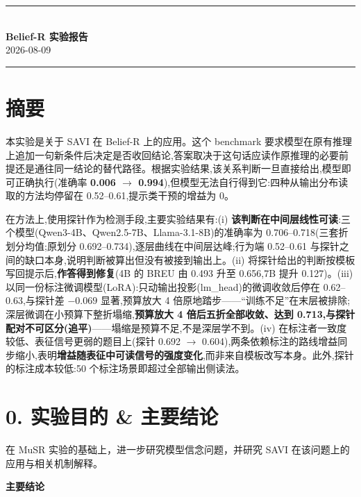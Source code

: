 \documentclass[fontset=none,10.5pt]{ctexart}
\begin{document}
\thispagestyle{empty}

\begin{center}
{\color{accent}\rule{\linewidth}{1.2pt}}\\[0.6em]
{\LARGE\bfseries\color{accent} Belief-R 实验报告}\\[0.5em]
{\small\color{black!55} 2026-08-09}\\[0.55em]
{\color{accent}\rule{\linewidth}{0.5pt}}
\end{center}
\vspace{0.4em}

\section*{摘要}

本实验是关于 SAVI 在 Belief-R 上的应用。这个 benchmark 要求模型在原有推理上追加一句新条件后决定是否收回结论,答案取决于这句话应读作原推理的必要前提还是通往同一结论的替代路径。根据实验结果,该关系判断一旦直接给出,模型即可正确执行(准确率 \textbf{0.006 $\to$ 0.994}),但模型无法自行得到它:四种从输出分布读取的方法均停留在 0.52--0.61,提示类干预的增益为 0。

在方法上,使用探针作为检测手段,主要实验结果有:(i) \textbf{该判断在中间层线性可读}:三个模型(Qwen3-4B、Qwen2.5-7B、Llama-3.1-8B)的准确率为 0.706--0.718(三套折划分均值;原划分 0.692--0.734),逐层曲线在中间层达峰;行为端 0.52--0.61 与探针之间的缺口本身,说明判断被算出但没有被接到输出上。(ii) 将探针给出的判断按模板写回提示后,\textbf{作答得到修复}(4B 的 BREU 由 0.493 升至 0.656,7B 提升 0.127)。(iii) 以同一份标注微调模型(LoRA):只动输出投影(lm\_head)的微调收敛后停在 0.62--0.63,与探针差 $-0.069$ 显著,预算放大 4 倍原地踏步——``训练不足''在末层被排除;深层微调在小预算下整折塌缩,\textbf{预算放大 4 倍后五折全部收敛、达到 0.713,与探针配对不可区分(追平)}——塌缩是预算不足,不是深层学不到。(iv) 在标注者一致度较低、表征信号更弱的题目上(探针 0.692 $\to$ 0.604),两条依赖标注的路线增益同步缩小,表明\textbf{增益随表征中可读信号的强度变化},而非来自模板改写本身。此外,探针的标注成本较低:50 个标注场景即超过全部输出侧读法。

\section*{0. 实验目的 \& 主要结论}

在 MuSR 实验的基础上，进一步研究模型信念问题，并研究 SAVI 在该问题上的应用与相关机制解释。

\textbf{主要结论}
\end{document}
